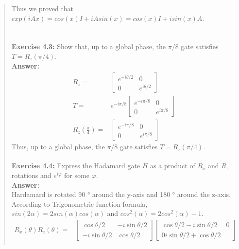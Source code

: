 \documentclass[UTF8]{ctexart}
\begin{document}
\begin{quote}
Thus we proved that $exp(iAx) = cos(x)I + iAsin(x)= cos(x)I + isin(x)A.$\\
\\
\\
\textbf{Exercise 4.3:} Show that, up to a global phase, the $\pi/8$ gate satisfies $T = R_{z}(\pi/4).$
  \\
\textbf{Answer:}\\
\begin{equation}
	\begin{aligned}
		R_{z}=&\begin{bmatrix}
			e^{-i\theta/2} & 0 \\
			0 & e^{i\theta/2} 
		\end{bmatrix} \\
		T=&e^{-i\pi/8} \begin{bmatrix}
			e^{-i\pi/8} & 0 \\
			0 & e^{i\pi/8} 
		\end{bmatrix}  \\
			R_{z}(\frac{\pi}{4})=&\begin{bmatrix}
				e^{-i \pi/8} & 0 \\
				0 & e^{i \pi/8} 
			\end{bmatrix}
	\end{aligned}
\end{equation}
Thus, up to a global phase, the  $\pi/8$ gate satisfies $T = R_{z}(\pi/4).$
 \\
\\
\textbf{Exercise 4.4: } Express the Hadamard gate $H$ as a product of $R_{x}$ and $R_{z}$ rotations and $e^{iφ} $ for some $φ$.\\
\textbf{Answer:}\\
Hardamard is rotated 90 ° around the y-axis and 180 ° around the z-axis. 
According to Trigonometric function formula, $sin(2\alpha)=2sin(\alpha)cos(\alpha)$ and $cos^{2}(\alpha)=2cos^{2}(\alpha)-1$.\\
\begin{equation}
	\begin{aligned}
		R_{x}(\theta)R_{z}(\theta)=&\begin{bmatrix}
			\cos{\theta/2}& -i\sin{\theta/2} \\  -i\sin{\theta/2} &\cos{\theta/2}
		\end{bmatrix}
		\begin{bmatrix}
			\cos{\theta/2} -i\sin{\theta/2}  & 0 \\0  i\sin{\theta/2} +\cos{\theta/2}
		\end{bmatrix}
		\\

\end{aligned}
\end{equation}
\end{quote}
\end{document}
